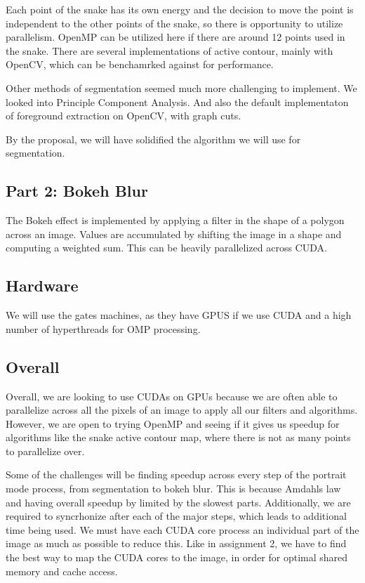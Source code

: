 \documentclass[12pt]{article}
\begin{document}
Each point of the snake has its own energy and the decision to move the point
is independent to the other points of the snake, so there is opportunity to
utilize parallelism. OpenMP can be utilized here if there are around 12 points
used in the snake. There are several implementations of active contour, mainly
with OpenCV, which can be benchamrked against for performance. \cite{cv-active}

Other methods of segmentation seemed much more challenging to implement.
We looked into Principle Component Analysis. \cite{pca-git} \cite{pca-paper}
And also the default implementaton of foreground extraction on OpenCV, with
graph cuts. \cite{cv-graphcut} \cite{grabcut-paper}

By the proposal, we will have solidified the algorithm we will use for
segmentation.

\subsection*{Part 2: Bokeh Blur}
The Bokeh effect is implemented by applying a filter in the shape of a polygon
across an image. Values are accumulated by shifting the image in a shape and
computing a weighted sum. This can be heavily parallelized across CUDA.
\cite{bokeh}

\subsection*{Hardware}
We will use the gates machines, as they have GPUS if we use CUDA and a high
number of hyperthreads for OMP processing.

\subsection*{Overall}
Overall, we are looking to use CUDAs on GPUs because we are often able to
parallelize across all the pixels of an image to apply all our filters and
algorithms.
However, we are open to trying OpenMP and seeing if it gives us speedup for
algorithms like the snake active contour map, where there is not as many points
to parallelize over.

Some of the challenges will be finding speedup across every step of the portrait
mode process, from segmentation to bokeh blur. This is because Amdahls law
and having overall speedup by limited by the slowest parts. Additionally, we
are required to syncrhonize after each of the major steps, which leads to
additional time being used. We must have each CUDA core process an individual
part of the image as much as possible to reduce this. Like in assignment 2, we
have to find the best way to map the CUDA cores to the image, in order for
optimal shared memory and cache access.
\end{document}
